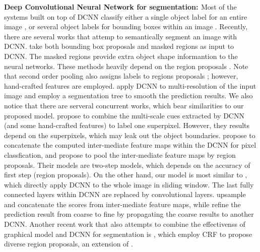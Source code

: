 {\bf{Deep Convolutional Neural Network for segmentation: }} Most of the systems built on top of DCNN classify either a single object label for an entire image \citep{KrizhevskyNIPS2013, simonyan2014very, szegedy2014going}, or several object labels for bounding boxes within an image \citep{papandreou2014untangling, girshick2014rcnn}. Recently, there are several works that attemp to semantically segment an image with DCNN. \citet{girshick2014rcnn, hariharan2014simultaneous} take both bounding box proposals and masked regions as input to DCNN. The masked regions provide extra object shape informantion to the neural networks. These methods heavily depend on the region proposals \citep{arbelaez2014multiscale, Uijlings13}. Note that second order pooling \citep{carreira2012semantic} also assigns labels to regions proposals \citep{carreira2012cpmc}; however, hand-crafted features are employed. \citet{farabet2013learning} apply DCNN to multi-resolution of the input image and employ a segmentation tree to smooth the prediction results. We also notice that there are serveral concurrent works, which bear similarities to our proposed model. \citet{mostajabi2014feedforward} propose to combine the multi-scale cues extracted by DCNN (and some hand-crafted features) to label one superpixel. However, they results depend on the superpixels, which may leak out the object boundaries. \citet{hariharan2014hypercolumns} propose to concatenate the computed inter-mediate feature maps within the DCNN for pixel classfication, and \citet{dai2014convolutional} propose to pool the inter-mediate feature maps by region proposals. Their models are two-step models, which depends on the accuracy of first step (\ie region proposals). On the other hand, our model is most similar to \citet{long2014fully, eigen2014predicting}, which directly apply DCNN to the whole image in sliding window. The last fully connected layers within DCNN are replaced by convolutional layers. \citet{long2014fully} upsample and concatenate the scores from inter-mediate feature maps, while \citet{eigen2014predicting} refine the prediction result from coarse to fine by propagating the coarse results to another DCNN. Another recent work that also attempts to combine the effectivenss of graphical model and DCNN for segmentation is \citet{cogswell2014combining}, which employ CRF to propose diverse region proposals, an extension of \citet{yadollahpour2013discriminative}.


